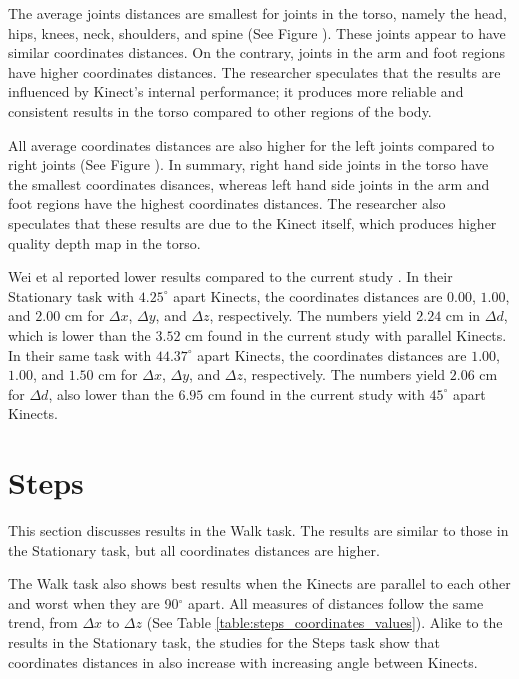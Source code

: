 The average joints distances are smallest for joints in the torso, namely the head, hips, knees, neck, shoulders, and spine (See Figure ). These joints appear to have similar coordinates distances. On the contrary, joints in the arm and foot regions have higher coordinates distances. The researcher speculates that the results are influenced by Kinect's internal performance; it produces more reliable and consistent results in the torso compared to other regions of the body.

All average coordinates distances are also higher for the left joints compared to right joints (See Figure ). In summary, right hand side joints in the torso have the smallest coordinates disances, whereas left hand side joints in the arm and foot regions have the highest coordinates distances. The researcher also speculates that these results are due to the Kinect itself, which produces higher quality depth map in the torso.

Wei et al reported lower results compared to the current study \cite{wei_kinect_calibration}. In their Stationary task with $4.25^{\circ}$ apart Kinects, the coordinates distances are $0.00$, $1.00$, and $2.00$ cm for $\Delta x$, $\Delta y$, and $\Delta z$, respectively. The numbers yield $2.24$ cm in $\Delta d$, which is lower than the $3.52$ cm found in the current study with parallel Kinects. In their same task with $44.37^{\circ}$ apart Kinects, the coordinates distances are $1.00$, $1.00$, and $1.50$ cm for $\Delta x$, $\Delta y$, and $\Delta z$, respectively. The numbers yield $2.06$ cm for $\Delta d$, also lower than the $6.95$ cm found in the current study with $45^{\circ}$ apart Kinects.

\section{Steps}
\label{sec:discussion_steps}

This section discusses results in the Walk task. The results are similar to those in the Stationary task, but all coordinates distances are higher.

The Walk task also shows best results when the Kinects are parallel to each other and worst when they are 90$^{\circ}$ apart. All measures of distances follow the same trend, from $\Delta x$ to $\Delta z$ (See Table \ref{table:steps_coordinates_values}). Alike to the results in the Stationary task, the studies for the Steps task show that coordinates distances in also increase with increasing angle between Kinects.

